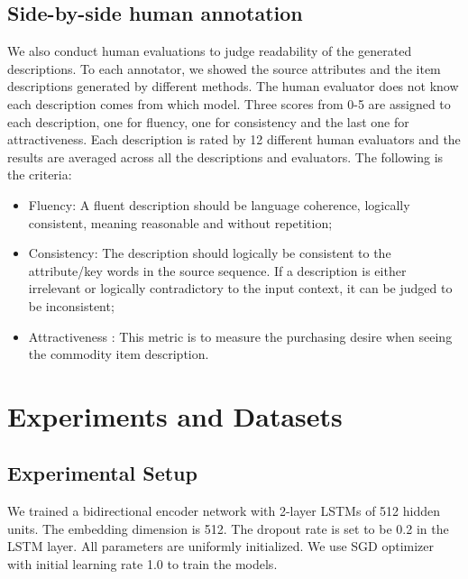 \documentclass[letterpaper]{article} %
\begin{document}
\subsection{Side-by-side human annotation}
We also conduct human evaluations to judge readability of the generated descriptions. 
To each annotator, we showed the source attributes and the item descriptions generated by different methods. 
The human evaluator does not know each description comes from which model. 
Three scores from 0-5 are assigned to each description, one for fluency, one for consistency and the last one for attractiveness. Each description is rated by 12 different human evaluators and the results are averaged across all the descriptions and evaluators. The following is the criteria:
\begin{itemize}
\item Fluency: A fluent description should be language coherence, logically consistent, meaning reasonable and without repetition;
\item Consistency: The description should logically be consistent to the attribute/key words in the source sequence. If a description is either irrelevant or logically contradictory to the input context, it can be judged to be inconsistent;
\item Attractiveness : This metric is to measure the purchasing desire when seeing the commodity item description.
\end{itemize}

\section{Experiments and Datasets}
\subsection{Experimental Setup}
We trained a bidirectional encoder network with 2-layer LSTMs of 512 hidden units. The embedding dimension is 512. The dropout rate is set to be 0.2 in the LSTM layer. All parameters are uniformly initialized. We use SGD optimizer with initial learning rate 1.0 to train the models.
 
\end{document}
